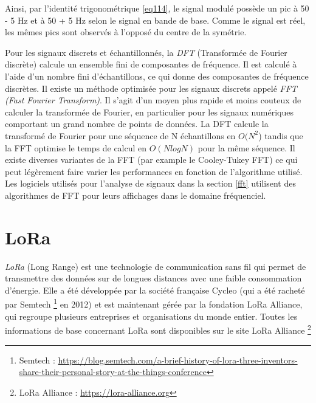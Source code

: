 Ainsi, par l'identité trigonométrique \ref{eq114}, le signal modulé possède un pic à 50 - 5 Hz et à 50 + 5 Hz selon le signal en bande de base. Comme le signal est réel, les mêmes pics sont observés à l'opposé du centre de la symétrie.

\vspace{0.1cm}

Pour les signaux discrets et échantillonnés, la \textit{DFT} (Transformée de Fourier discrète) calcule un ensemble fini de composantes de fréquence. Il est calculé à l’aide d’un nombre fini d’échantillons, ce qui donne des composantes de fréquence discrètes. Il existe un méthode optimisée pour les signaux discrets appelé \textit{FFT (Fast Fourier Transform)}\cite{fft}. Il s'agit d'un moyen plus rapide et moins couteux de calculer la transformée de Fourier, en particulier pour les signaux numériques comportant un grand nombre de points de données. La DFT calcule la transformé de Fourier pour une séquence de N échantillons en $O(N^2$) tandis que la FFT optimise le temps de calcul en $O(N log N)$ pour la même séquence. Il existe diverses variantes de la FFT (par example le Cooley-Tukey FFT\cite{fft1}) ce qui peut légèrement faire varier les performances en fonction de l'algorithme utilisé. Les logiciels utilisés pour l'analyse de signaux dans la section \ref{fft} utilisent des algorithmes de FFT pour leurs affichages dans le domaine fréquenciel.

\newpage

\section{LoRa}

\textit{LoRa} (Long Range) est une technologie de communication sans fil qui permet de transmettre des données sur de longues distances avec une faible consommation d'énergie. Elle a été développée par la société française Cycleo (qui a été racheté par Semtech \footnote{Semtech : \href{https://blog.semtech.com/a-brief-history-of-lora-three-inventors-share-their-personal-story-at-the-things-conference}{https://blog.semtech.com/a-brief-history-of-lora-three-inventors-share-their-personal-story-at-the-things-conference}} en 2012) et est maintenant gérée par la fondation LoRa Alliance, qui regroupe plusieurs entreprises et organisations du monde entier. Toutes les informations de base concernant LoRa sont disponibles sur le site LoRa Alliance \footnote{LoRa Alliance : \href{https://lora-alliance.org}{https://lora-alliance.org}}


